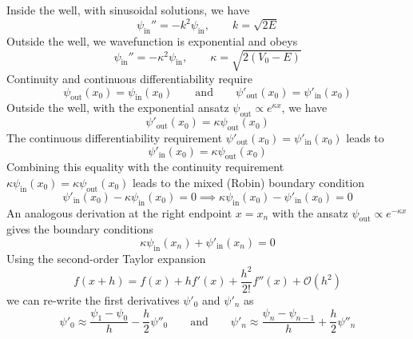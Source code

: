 \documentclass[11pt, a4paper]{article}
\newcommand{\eqtext}[1]{\qquad \text{#1} \qquad}
\begin{document}
Inside the well, with sinusoidal solutions, we have
\begin{equation*}
	\psi_{\text{in}}'' = -k^{2}\psi_{\text{in}}, \qquad k = \sqrt{2E}
\end{equation*}
Outside the well, we wavefunction is exponential and obeys
\begin{equation*}
	\psi_{\text{in}}'' = -\kappa^{2}\psi_{\text{in}}, \qquad \kappa = \sqrt{2(V_{0} - E)}
\end{equation*}
Continuity and continuous differentiability require
\begin{equation*}
	\psi_{\text{out}}(x_{0}) = \psi_{\text{in}}(x_{0}) \eqtext{and} \psi'_{\text{out}}(x_{0}) = \psi'_{\text{in}}(x_{0})
\end{equation*}
Outside the well, with the exponential ansatz $ \psi_{\text{out}} \propto e^{\kappa x} $, we have
\begin{equation*}
	\psi'_{\text{out}}(x_{0}) = \kappa \psi_{\text{out}}(x_{0})
\end{equation*}
The continuous differentiability requirement $ \psi'_{\text{out}}(x_{0}) = \psi'_{\text{in}}(x_{0}) $ leads to
\begin{equation*}
	\psi'_{\text{in}}(x_{0}) = \kappa \psi_{\text{out}}(x_{0})
\end{equation*}
Combining this equality with the continuity requirement $ \kappa \psi_{\text{in}}(x_{0}) = \kappa \psi_{\text{out}}(x_{0}) $ leads to the mixed (Robin) boundary condition
\begin{equation*}
	\psi'_{\text{in}}(x_{0}) - \kappa \psi_{\text{in}}(x_{0}) = 0 \implies  \kappa \psi_{\text{in}}(x_{0}) - \psi'_{\text{in}}(x_{0}) = 0
\end{equation*}
An analogous derivation at the right endpoint $ x = x_{n} $ with the ansatz $ \psi_{\text{out}} \propto e^{-\kappa x} $ gives the boundary conditions
\begin{equation*}
	\kappa \psi_{\text{in}}(x_{n}) + \psi'_{\text{in}}(x_{n}) = 0
\end{equation*}
Using the second-order Taylor expansion
\begin{equation*}
	f(x+h) = f(x) + hf'(x) + \frac{h^{2}}{2!}f''(x) + \mathcal{O}(h^{2})
\end{equation*}
we can re-write the first derivatives $ \psi'_{0} $ and $ \psi'_{n} $ as
\begin{equation*}
	\psi'_{0} \approx \frac{\psi_{1} - \psi_{0}}{h} - \frac{h}{2}\psi''_0 \eqtext{and} \psi'_{n} \approx \frac{\psi_{n} - \psi_{n-1}}{h} + \frac{h}{2}\psi''_{n} 
\end{equation*}
\end{document}
